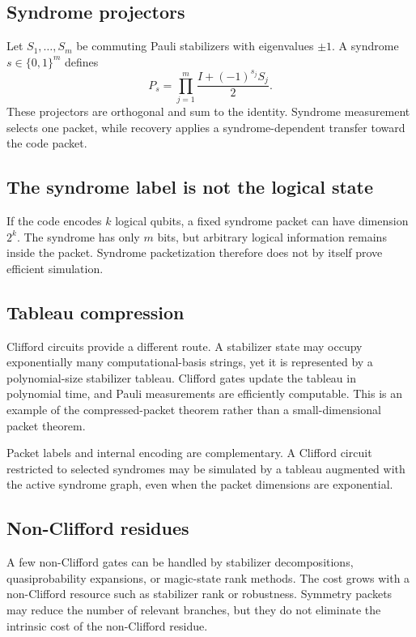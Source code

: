 \subsection{Syndrome projectors}
Let $S_1,\ldots,S_m$ be commuting Pauli stabilizers with eigenvalues $\pm1$. A syndrome $s\in\{0,1\}^m$ defines
\[
P_s
=
\prod_{j=1}^m
\frac{I+(-1)^{s_j}S_j}{2}.
\]
These projectors are orthogonal and sum to the identity. Syndrome measurement selects one packet, while recovery applies a syndrome-dependent transfer toward the code packet.

\subsection{The syndrome label is not the logical state}
If the code encodes $k$ logical qubits, a fixed syndrome packet can have dimension $2^k$. The syndrome has only $m$ bits, but arbitrary logical information remains inside the packet. Syndrome packetization therefore does not by itself prove efficient simulation.

\subsection{Tableau compression}
Clifford circuits provide a different route. A stabilizer state may occupy exponentially many computational-basis strings, yet it is represented by a polynomial-size stabilizer tableau. Clifford gates update the tableau in polynomial time, and Pauli measurements are efficiently computable. This is an example of the compressed-packet theorem rather than a small-dimensional packet theorem.

\begin{derivedbox}
Packet labels and internal encoding are complementary. A Clifford circuit restricted to selected syndromes may be simulated by a tableau augmented with the active syndrome graph, even when the packet dimensions are exponential.
\end{derivedbox}

\subsection{Non-Clifford residues}
A few non-Clifford gates can be handled by stabilizer decompositions, quasiprobability expansions, or magic-state rank methods. The cost grows with a non-Clifford resource such as stabilizer rank or robustness. Symmetry packets may reduce the number of relevant branches, but they do not eliminate the intrinsic cost of the non-Clifford residue.

